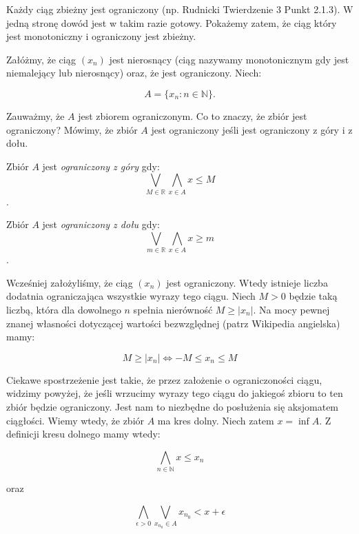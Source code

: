 \documentclass[a4paper,oneside,openright,11pt]{article}
\numberwithin{equation}{section}
\begin{document}
Każdy ciąg zbieżny jest ograniczony (np. Rudnicki Twierdzenie 3 Punkt 2.1.3). W jedną stronę dowód jest w takim razie gotowy.
Pokażemy zatem, że ciąg który jest monotoniczny i ograniczony jest zbieżny.
\vspace{10mm}


\noindent
Załóżmy, że ciąg $(x_n)$ jest nierosnący (ciąg nazywamy monotonicznym gdy jest niemalejący lub nierosnący) oraz, że jest ograniczony.
Niech: 

\begin{equation*}
    A = \{ x_n : n \in \mathbb{N} \}.
\end{equation*}


\noindent
Zauważmy, że $A$ jest zbiorem ograniczonym. Co to znaczy, że zbiór jest ograniczony? Mówimy, że zbiór $A$ jest ograniczony jeśli
jest ograniczony z góry i z dołu.
\vspace{10mm}

Zbiór $A$ jest \emph{ograniczony z góry} gdy: $$\bigvee_{M \in \mathbb{R}}  \bigwedge_{x \in A} x \leq M$$.

Zbiór $A$ jest \emph{ograniczony z dołu} gdy: $$\bigvee_{m \in \mathbb{R}}  \bigwedge_{x \in A} x \geq m$$.


Wcześniej założyliśmy, że ciąg $(x_n)$ jest ograniczony. Wtedy istnieje liczba dodatnia ograniczająca wszystkie wyrazy tego ciągu. Niech $M > 0$ będzie taką liczbą, 
która dla dowolnego $n$ spełnia nierówność $M \geq |x_n|$. Na mocy pewnej znanej własności dotyczącej wartości bezwzględnej (patrz Wikipedia angielska) mamy:


\begin{equation*}
    M \geq |x_n| \iff -M \leq x_n \leq M
\end{equation*}

\noindent
Ciekawe spostrzeżenie jest takie, że przez założenie o ograniczoności ciągu, widzimy powyżej, że jeśli wrzucimy wyrazy tego ciągu do jakiegoś zbioru
to ten zbiór będzie ograniczony. Jest nam to niezbędne do posłużenia się aksjomatem ciągłości. Wiemy wtedy, że zbiór $A$ ma kres dolny.
Niech zatem $x = \inf A$. Z definicji kresu dolnego mamy wtedy:


\begin{equation*}
    \bigwedge_{n \in \mathbb{N}} x \leq x_n
\end{equation*}

oraz

\begin{equation*}
    \bigwedge_{\epsilon > 0} \bigvee_{x_{n_0} \in A} x_{n_0} < x + \epsilon
\end{equation*}
\end{document}
